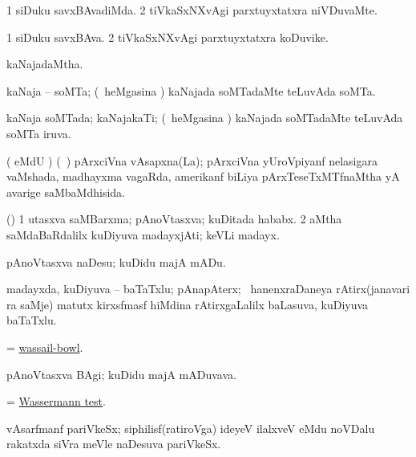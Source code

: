 \bentry
{} 
\gl{\kirxvi}
\expl{}
\bmng
\bnum
\num{1} siDuku savxBAvadiMda. 
\num{2} tiVkaSxNXvAgi parxtuyxtatxra niVDuvaMte. 
\enum
\emng
\eentry

\bentry
{} 
\gl{\nA}
\expl{}
\bmng
\bnum
\num{1} siDuku savxBAva. 
\num{2} tiVkaSxNXvAgi parxtuyxtatxra koDuvike. 
\enum
\emng
\eentry

\bentry
{} 
\gl{\gu}
\expl{}
\bmng
kaNajadaMtha. 
\emng
\eentry

\bentry
{} 
\gl{\nA}
\expl{}
\bmng
kaNaja -- soMTa; (\kanmu\ heMgasina \vi) kaNajada soMTadaMte teLuvAda soMTa. 
\emng
\eentry

\bentry
{} 
\gl{\gu}
\expl{}
\bmng
kaNaja soMTada; kaNajakaTi; (\kanmu\ heMgasina \vi) kaNajada soMTadaMte teLuvAda soMTa iruva. 
\emng
\eentry

\bentry
{} 
\gl{\gu}
\expl{}
\bmng
( eMdU \parx) (\sA\ \hiV) pArxciVna vAsapxna(La); pArxciVna yUroVpiyanf nelasigara vaMshada, madhayxma vagaRda, amerikanf biLiya pArxTeseTxMTfnaMtha yA avarige saMbaMdhisida. 
\emng
\eentry

\bentry
{} 
\gl{\nA}
\expl{}
\bmng
(\pArxparx) 
\bnum
\num{1} utasxva saMBarxma; pAnoVtasxva; kuDitada hababx. 
\num{2} aMtha saMdaBaRdalilx kuDiyuva madayxjAti; keVLi madayx. 
\enum
\emng
\eentry

\bentry
{} 
\gl{\akirx}
\expl{}
\bmng
pAnoVtasxva naDesu; kuDidu majA mADu. 
\emng
\eentry

\bentry
{} 
\gl{\nA}
\expl{}
\bmng
madayxda, kuDiyuva -- baTaTxlu; pAnapAterx; \kanmu\ hanenxraDaneya rAtirx(janavari ra saMje) matutx kirxsfmasf hiMdina rAtirxgaLalilx baLasuva, kuDiyuva baTaTxlu. 
\emng
\eentry

\bentry
{} 
\gl{\nA}
\expl{}
\bmng
= \hyperlink{wassail-bowl}{wassail-bowl}. 
\emng
\eentry

\bentry
{} 
\gl{\nA}
\expl{}
\bmng
pAnoVtasxva BAgi; kuDidu majA mADuvava. 
\emng
\eentry

\bentry
{} 
\gl{\nA}
\expl{}
\bmng
= \hyperlink{Wassermann test}{Wassermann test}. 
\emng
\eentry

\bentry
{} 
\gl{\nA}
\expl{}
\bmng
vAsarfmanf pariVkeSx; siphilisf(ratiroVga) ideyeV ilalxveV eMdu noVDalu rakatxda siVra meVle naDesuva pariVkeSx. 
\emng
\eentry

